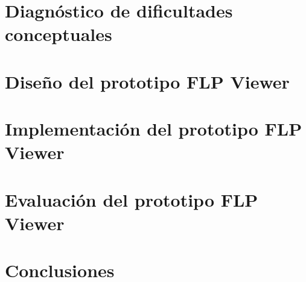 \documentclass[letterpaper, 11pt, oneside]{book}
\begin{document}







\chapter[Diagnóstico de dificultades conceptuales]{Diagnóstico de dificultades conceptuales}
\label{cap3}






\chapter[Diseño del prototipo FLP Viewer]{Diseño del prototipo FLP Viewer}
\label{cap4}




\chapter[Implementación del prototipo FLP Viewer]{Implementación del prototipo FLP Viewer}
\label{cap5}


\chapter[Evaluación del prototipo FLP Viewer]{Evaluación del prototipo FLP Viewer}
\label{cap6}


\chapter{Conclusiones}
\label{cap7}


\end{document}
